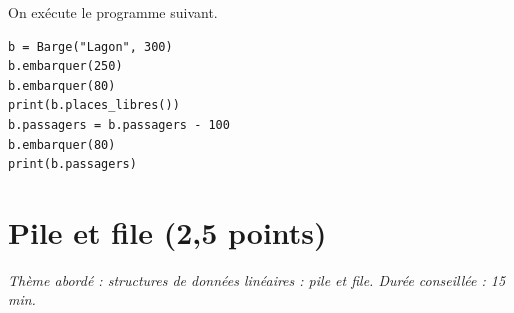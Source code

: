 \documentclass[a4paper, noanswers, addpoints, 12pt]{exam}
\newenvironment{gauche}[1][0.5]{\par\noindent\begin{minipage}[t]{#1\linewidth}\vspace{0pt}}{\end{minipage}}
\newenvironment{droite}[1][0.47]{\hfill\begin{minipage}[t]{#1\linewidth}\vspace{0pt}\raggedright}{\end{minipage}\par}
\begin{document}
\begin{questions}

\question On exécute le programme suivant.
\par\smallskip
\begin{gauche}[0.58]
\begin{lstlisting}[basicstyle=\ttfamily\footnotesize]
b = Barge("Lagon", 300)
b.embarquer(250)
b.embarquer(80)
print(b.places_libres())
b.passagers = b.passagers - 100
b.embarquer(80)
print(b.passagers)
\end{lstlisting}
\end{gauche}
\begin{droite}[0.39]
\end{droite}

\section{Pile et file (2,5 points)}
\begin{center}\textit{Thème abordé : structures de données linéaires : pile et file. Durée conseillée : 15 min.}\end{center}


\end{questions}
\end{document}

